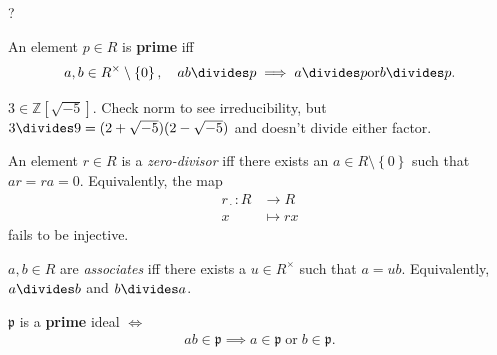 \begin{definition}[Semisimple]

?

\end{definition}

\begin{definition}

An element \(p\in R\) is \textbf{prime} iff
\begin{align*}  
a,b \in R^{\times}\setminus\left\{{0}\right\}, \quad ab\divides p \implies a\divides p {\operatorname{ {or} }} b\divides p
.\end{align*}

\end{definition}

\begin{example}

\(3\in {\mathbb{Z}}[\sqrt{-5}]\). Check norm to see irreducibility, but
\(3 \divides 9 = (2+\sqrt{-5})(2-\sqrt{-5})\) and doesn't divide either
factor.

\end{example}

\begin{definition}

An element \(r\in R\) is a \emph{zero-divisor} iff there exists an
\(a\in R\setminus\left\{{0}\right\}\) such that \(ar = ra = 0\).
Equivalently, the map
\begin{align*}  
r_{\,\cdot\,}: R &\to R \\
x &\mapsto rx
\end{align*}
fails to be injective.

\end{definition}

\begin{definition}

\(a, b\in R\) are \emph{associates} iff there exists a
\(u\in R^{\times}\) such that \(a = ub\). Equivalently, \(a\divides b\)
and \(b\divides a\).

\end{definition}

\begin{definition}

\({\mathfrak{p}}\) is a \textbf{prime} ideal \(\iff\)
\begin{align*} 
ab\in {\mathfrak{p}}\implies a\in {\mathfrak{p}}{\operatorname{ {or} }} b\in {\mathfrak{p}}
.\end{align*}

\end{definition}

